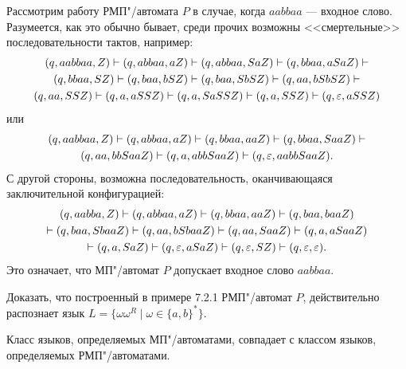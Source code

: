 \begin{myexample}
Рассмотрим работу РМП"/автомата $P$ в случае, когда $aabbaa$ --- входное слово. Разумеется, как это обычно бывает, среди прочих возможны <<смертельные>> последовательности тактов, например:
\begin{multline*}
(q,aabbaa,Z) \vdash (q,abbaa,aZ) \vdash (q,abbaa,SaZ) \vdash (q,bbaa,aSaZ) \vdash \\ (q,bbaa,SZ) \vdash (q,baa,bSZ) \vdash (q,baa,SbSZ) \vdash (q,aa,bSbSZ) \vdash \\ (q,aa,SSZ) \vdash (q,a,aSSZ) \vdash (q,a,SaSSZ) \vdash (q,a,SSZ) \vdash (q,\varepsilon,aSSZ)
\end{multline*}
или
\begin{multline*}
(q,aabbaa,Z) \vdash (q,abbaa,aZ) \vdash (q,bbaa,aaZ) \vdash (q,bbaa,SaaZ) \vdash \\ (q,aa,bbSaaZ) \vdash (q,a,abbSaaZ) \vdash (q,\varepsilon,aabbSaaZ).
\end{multline*}
С другой стороны, возможна последовательность, оканчивающаяся заключительной конфигурацией:
\begin{multline*}
    (q,aabba,Z) \vdash
    (q,abbaa,aZ) \vdash
    (q,bbaa,aaZ) \vdash
    (q,baa,baaZ) \\
    \vdash
    (q,baa,SbaaZ) \vdash
    (q,aa,bSbaaZ) \vdash
    (q,aa,SaaZ) \vdash
    (q,a,aSaaZ) \\
    \vdash
    (q,a,SaZ) \vdash
    (q,\varepsilon,aSaZ) \vdash
    (q,\varepsilon,SZ) \vdash
    (q,\varepsilon,\varepsilon).
\end{multline*}
Это означает, что МП"/автомат $P$ допускает входное слово $aabbaa$.
\end{myexample}

\begin{myproblem}
Доказать, что построенный в примере 7.2.1 РМП"/автомат $P$, действительно распознает язык $L=\{\omega\omega^R\mid\omega\in\{a,b\}^*\}$.
\end{myproblem}

\begin{mytheorem}
Класс языков, определяемых МП"/автоматами, совпадает с классом языков, определяемых РМП"/автоматами.
\end{mytheorem}

